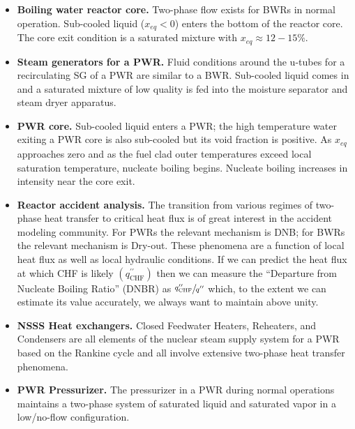\begin{itemize}
\item \textbf{Boiling water reactor core.}  Two-phase flow exists for BWRs in normal operation.  Sub-cooled liquid ($x_{eq}<0$) enters the bottom of the reactor core.  The core exit condition is a saturated mixture with $x_{eq} \approx 12-15 \%$. 

\item \textbf{Steam generators for a PWR.}  Fluid conditions around the u-tubes for a recirculating SG of a PWR are similar to a BWR.  Sub-cooled liquid comes in and a saturated mixture of low quality is fed into the moisture separator and steam dryer apparatus.  

\item \textbf{PWR core.} Sub-cooled liquid enters a PWR; the high temperature water exiting a PWR core is also sub-cooled but its void fraction is positive.  As $x_{eq}$ approaches zero and as the fuel clad outer temperatures exceed local saturation temperature, nucleate boiling begins.  Nucleate boiling increases in intensity near the core exit.

\item \textbf{Reactor accident analysis.}  The transition from various regimes of two-phase heat transfer to critical heat flux is of great interest in the accident modeling community.  For PWRs the relevant mechanism is DNB; for BWRs the relevant mechanism is Dry-out.  These phenomena are a function of local heat flux as well as local hydraulic conditions.  If we can predict the heat flux at which CHF is likely $(q^{\prime \prime}_{\text{CHF}})$ then we can measure the ``Departure from Nucleate Boiling Ratio'' (DNBR) as $\sfrac{q^{\prime \prime}_{\text{CHF}}}{q^{\prime \prime}}$ which, to the extent we can estimate its value accurately, we always want to maintain above unity.

\item \textbf{NSSS Heat exchangers.} Closed Feedwater Heaters, Reheaters, and Condensers are all elements of the nuclear steam supply system for a PWR based on the Rankine cycle and all involve extensive two-phase heat transfer phenomena.  

\item \textbf{PWR Pressurizer.} The pressurizer in a PWR during normal operations maintains a two-phase system of saturated liquid and saturated vapor in a low/no-flow configuration.  

\end{itemize}

